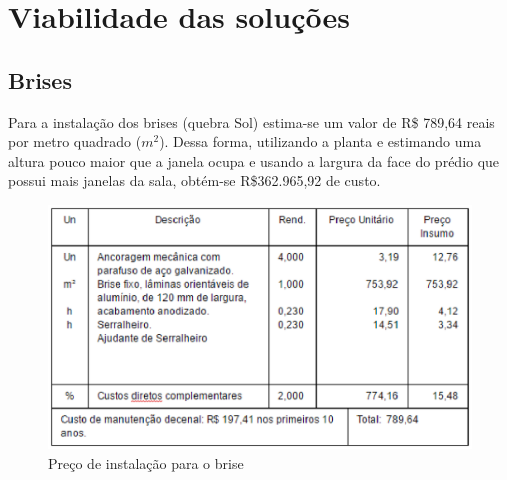 \section{Viabilidade das soluções}
\subsection{Brises}
Para a instalação dos brises (quebra Sol) estima-se um valor de R\$ 789,64 reais por metro quadrado ($m^2$). Dessa forma, utilizando a planta e estimando uma altura pouco maior que a janela ocupa e usando a largura da face do prédio que possui mais janelas da sala, obtém-se R\$362.965,92 de custo.

\begin{figure}[!h]
  \centering
  \includegraphics[keepaspectratio=true,scale=1]{figuras/tabelapreco.eps}
  \caption{Preço de instalação para o brise}
  \label{fig:preco_brise}
\end{figure}

